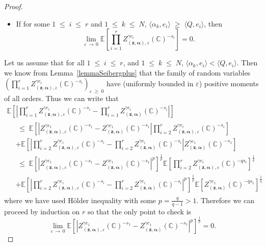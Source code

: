 \documentclass[AHL,Unicode,longabstracts,published]{cedram}
\renewcommand{\leq}{\;\leqslant\;}
\renewcommand{\geq}{\;\geqslant\;}
\newcommand{\C}{\mathbb{C}}
\newcommand{\E}{\mathbb{E}}
\newcommand{\ps}[1]{\langle #1 \rangle}
\newcommand*\eps{\varepsilon}
\newcommand{\norm}[1]{\left\lvert#1\right\rvert}
\begin{document}
\begin{proof}
\begin{itemize}
\item If for some $1\leq i \leq r$ and $1\leq k\leq N$, $\ps{\alpha_k,e_i}\geq\ps{Q,e_i}$, then
\begin{equation*}
\lim\limits_{\eps\,\rightarrow\,0}\E \left[\prod_{i=1}^{r} Z_{\left(\bm z,\bm \alpha\right), \eps}^{\gamma e_i} (\C)^{- s_i} \right]=0.
\end{equation*}
\end{itemize}
Let us assume that for all $1\leq i \leq r$, and $1\leq k\leq N$, $\ps{\alpha_k,e_i}<\ps{Q,e_i}$. Then we know from Lemma~\ref{lemmaSeibergplus} that the family of random variables 
$(\prod_{i=1}^{r} Z_{(\bm z,\bm \alpha), \eps}^{\gamma e_i} (\C)^{- s_i})_{\eps\geq0}$ have (uniformly bounded in $\eps$) positive moments of all orders. Thus we can write that
\begin{multline*}
\E \left [\left| \prod_{i=1}^{r} Z_{(\bm z,\bm \alpha), \eps}^{\gamma e_i} (\C)^{- s_i} - \prod_{i=1}^{r} Z_{(\bm z,\bm \alpha)}^{\gamma e_i} (\C)^{- s_i} \right| \right]\\
\begin{aligned}
&\leq \E \left [\left| Z_{(\bm z,\bm \alpha), \eps}^{\gamma e_1} (\C)^{- s_1}-Z_{(\bm z,\bm \alpha)}^{\gamma e_1} (\C)^{- s_1}\right| \prod_{i=2}^{r} Z_{(\bm z,\bm \alpha), \eps}^{\gamma e_i} (\C)^{- s_i} \right]\\
& +\E \left [\norm{ \prod_{i=2}^{r} Z_{(\bm z,\bm \alpha), \eps}^{\gamma e_i} (\C)^{- s_i} - \prod_{i=2}^{r} Z_{(\bm z,\bm \alpha)}^{\gamma e_i} (\C)^{- s_i} } Z_{(\bm z,\bm \alpha)}^{\gamma e_1} (\C)^{- s_1} \right]\\
&\leq \E \left [\norm{ Z_{(\bm z,\bm \alpha), \eps}^{\gamma e_1} (\C)^{- s_1}-Z_{(\bm z,\bm \alpha)}^{\gamma e_1} (\C)^{- s_1}}^p\right]^{\frac1p}\E\left[\prod_{i=2}^{r} Z_{(\bm z,\bm \alpha), \eps}^{\gamma e_i} (\C)^{- qs_i} \right]^{\frac 1q}\\
&+\E \left [\norm{ \prod_{i=2}^{r} Z_{(\bm z,\bm \alpha), \eps}^{\gamma e_i} (\C)^{- s_i} - \prod_{i=2}^{r} Z_{(\bm z,\bm \alpha)}^{\gamma e_i} (\C)^{- s_i} }^p\right]^{\frac1p}\E\left[Z_{(\bm z,\bm \alpha)}^{\gamma e_1} (\C)^{- qs_1} \right]^{\frac1q}
\end{aligned}
\end{multline*}
where we have used H\"older inequality with some $p=\frac{q}{q-1}>1$. Therefore we can proceed by induction on $r$ so that the only point to check is 
\[
\lim\limits_{\eps\,\to\,0}\E \left [\norm{ Z_{(\bm z,\bm \alpha), \eps}^{\gamma e_1} (\C)^{- s_1}-Z_{(\bm z,\bm \alpha)}^{\gamma e_1} (\C)^{- s_1}}^p\right]^{\frac1p}=0.
\]
\end{proof}
\end{document}
